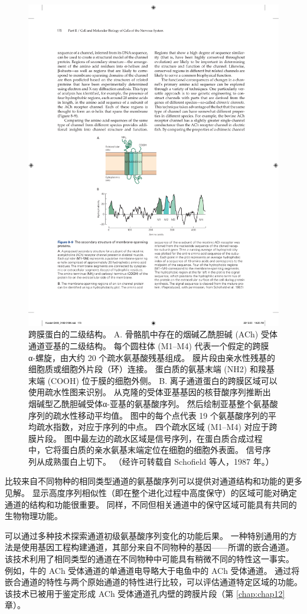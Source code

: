 \begin{figure}[htbp]
	\centering
	\includegraphics[width=0.6\linewidth]{chap08/fig_8_9}
	\caption{跨膜蛋白的二级结构。 A. 骨骼肌中存在的烟碱乙酰胆碱 (ACh) 受体通道亚基的二级结构。 每个圆柱体 (M1–M4) 代表一个假定的跨膜 α-螺旋，由大约 20 个疏水氨基酸残基组成。 膜片段由亲水性残基的细胞质或细胞外片段（环）连接。 蛋白质的氨基末端 (NH2) 和羧基末端 (COOH) 位于膜的细胞外侧。 B. 离子通道蛋白的跨膜区域可以使用疏水性图来识别。 从克隆的受体亚基基因的核苷酸序列推断出烟碱型乙酰胆碱受体α-亚基的氨基酸序列。 然后绘制亚基整个氨基酸序列的疏水性移动平均值。 图中的每个点代表 19 个氨基酸序列的平均疏水指数，对应于序列的中点。 四个疏水区域 (M1–M4) 对应于跨膜片段。 图中最左边的疏水区域是信号序列，在蛋白质合成过程中，它将蛋白质的亲水氨基末端定位在细胞的细胞外表面。 信号序列从成熟蛋白上切下。 （经许可转载自 Schofield 等人，1987 年。）}
	\label{fig:8_9}
\end{figure}


比较来自不同物种的相同类型通道的氨基酸序列可以提供对通道结构和功能的更多见解。 
显示高度序列相似性（即在整个进化过程中高度保守）的区域可能对确定通道的结构和功能很重要。 
同样，不同但相关通道中的保守区域可能具有共同的生物物理功能。


可以通过多种技术探索通道初级氨基酸序列变化的功能后果。 
一种特别通用的方法是使用基因工程构建通道，其部分来自不同物种的基因——所谓的嵌合通道。 
该技术利用了相同类型的通道在不同物种中可能具有稍微不同的特性这一事实。 
例如，牛的 ACh 受体通道的单通道电导略大于电鱼中的 ACh 受体通道。 
通过将嵌合通道的特性与两个原始通道的特性进行比较，可以评估通道特定区域的功能。 
该技术已被用于鉴定形成 ACh 受体通道孔内壁的跨膜片段（第 \ref{chap:chap12} 章）。


